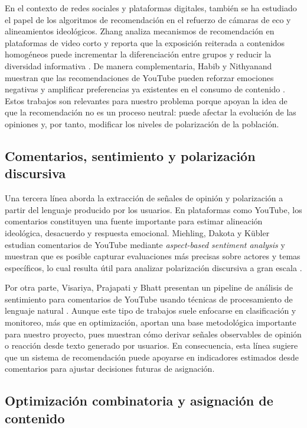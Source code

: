 \documentclass[10pt,letterpaper]{article}
\begin{document}
En el contexto de redes sociales y plataformas digitales, tambi\'en se ha estudiado el papel de los algoritmos de recomendaci\'on en el refuerzo de c\'amaras de eco y alineamientos ideol\'ogicos. Zhang analiza mecanismos de recomendaci\'on en plataformas de video corto y reporta que la exposici\'on reiterada a contenidos homog\'eneos puede incrementar la diferenciaci\'on entre grupos y reducir la diversidad informativa \cite{zhang2026mechanisms}. De manera complementaria, Habib y Nithyanand muestran que las recomendaciones de YouTube pueden reforzar emociones negativas y amplificar preferencias ya existentes en el consumo de contenido \cite{habib2025youtube}. Estos trabajos son relevantes para nuestro problema porque apoyan la idea de que la recomendaci\'on no es un proceso neutral: puede afectar la evoluci\'on de las opiniones y, por tanto, modificar los niveles de polarizaci\'on de la poblaci\'on.

\subsection{Comentarios, sentimiento y polarizaci\'on discursiva}

Una tercera l\'inea aborda la extracci\'on de se\~nales de opini\'on y polarizaci\'on a partir del lenguaje producido por los usuarios. En plataformas como YouTube, los comentarios constituyen una fuente importante para estimar alineaci\'on ideol\'ogica, desacuerdo y respuesta emocional. Miehling, Dakota y K\"ubler estudian comentarios de YouTube mediante \textit{aspect-based sentiment analysis} y muestran que es posible capturar evaluaciones m\'as precisas sobre actores y temas espec\'ificos, lo cual resulta \'util para analizar polarizaci\'on discursiva a gran escala \cite{miehling2025absa}.

Por otra parte, Visariya, Prajapati y Bhatt presentan un pipeline de an\'alisis de sentimiento para comentarios de YouTube usando t\'ecnicas de procesamiento de lenguaje natural \cite{visariya2025youtube}. Aunque este tipo de trabajos suele enfocarse en clasificaci\'on y monitoreo, m\'as que en optimizaci\'on, aportan una base metodol\'ogica importante para nuestro proyecto, pues muestran c\'omo derivar se\~nales observables de opini\'on o reacci\'on desde texto generado por usuarios. En consecuencia, esta l\'inea sugiere que un sistema de recomendaci\'on puede apoyarse en indicadores estimados desde comentarios para ajustar decisiones futuras de asignaci\'on.

\subsection{Optimizaci\'on combinatoria y asignaci\'on de contenido}
\end{document}

